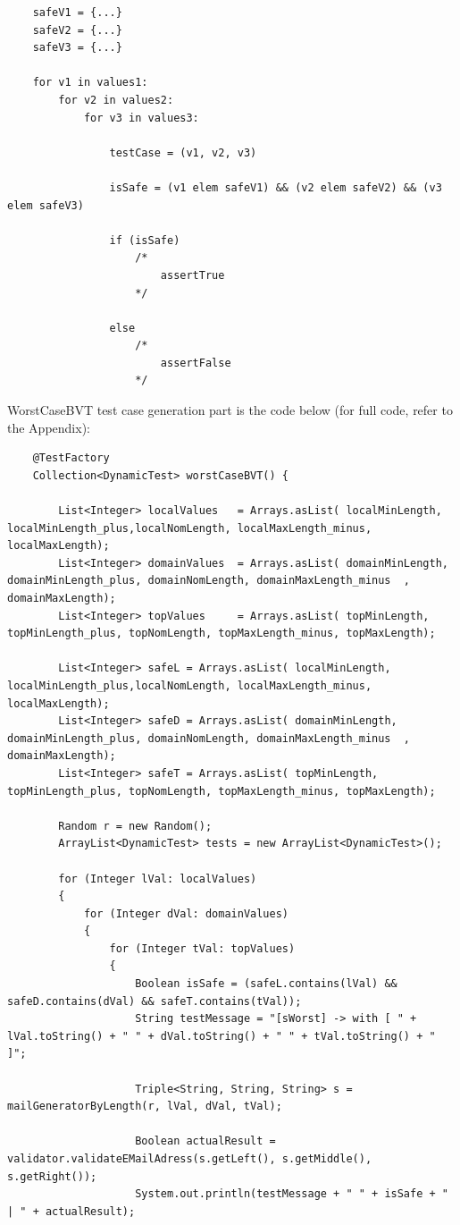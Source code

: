 \documentclass[a4paper,9pt,oneside]{scrreprt}
\begin{document}
\begin{enumerate}[a)]
\begin{paracol}{2}
\begin{lstlisting}
	safeV1 = {...}
	safeV2 = {...}
	safeV3 = {...}
	
	for v1 in values1:
		for v2 in values2:
			for v3 in values3:
			
				testCase = (v1, v2, v3)
				
				isSafe = (v1 elem safeV1) && (v2 elem safeV2) && (v3 elem safeV3)
				
				if (isSafe)
					/* 
						assertTrue 
					*/
					
				else
					/* 
						assertFalse 
					*/
			\end{lstlisting}
				
				
			\end{paracol}
		\clearpage
		
		WorstCaseBVT test case generation part is the code below (for full code, refer to the Appendix):
\begin{lstlisting}
	@TestFactory
	Collection<DynamicTest> worstCaseBVT() {
		
		List<Integer> localValues	= Arrays.asList( localMinLength, localMinLength_plus,localNomLength, localMaxLength_minus, localMaxLength);
		List<Integer> domainValues	= Arrays.asList( domainMinLength, domainMinLength_plus, domainNomLength, domainMaxLength_minus	, domainMaxLength);
		List<Integer> topValues		= Arrays.asList( topMinLength, topMinLength_plus, topNomLength, topMaxLength_minus, topMaxLength);
		
		List<Integer> safeL	= Arrays.asList( localMinLength, localMinLength_plus,localNomLength, localMaxLength_minus, localMaxLength);
		List<Integer> safeD	= Arrays.asList( domainMinLength, domainMinLength_plus, domainNomLength, domainMaxLength_minus	, domainMaxLength);
		List<Integer> safeT	= Arrays.asList( topMinLength, topMinLength_plus, topNomLength, topMaxLength_minus, topMaxLength);
		
		Random r = new Random();
		ArrayList<DynamicTest> tests = new ArrayList<DynamicTest>();
		
		for (Integer lVal: localValues) 
		{
			for (Integer dVal: domainValues) 
			{    			
				for (Integer tVal: topValues) 
				{
					Boolean isSafe = (safeL.contains(lVal) && safeD.contains(dVal) && safeT.contains(tVal));
					String testMessage = "[sWorst] -> with [ " + lVal.toString() + " " + dVal.toString() + " " + tVal.toString() + " ]";
					
					Triple<String, String, String> s = mailGeneratorByLength(r, lVal, dVal, tVal);
					
					Boolean actualResult = validator.validateEMailAdress(s.getLeft(), s.getMiddle(), s.getRight());
					System.out.println(testMessage + " " + isSafe + " | " + actualResult);
					

\end{lstlisting}
\end{enumerate}
\end{document}
